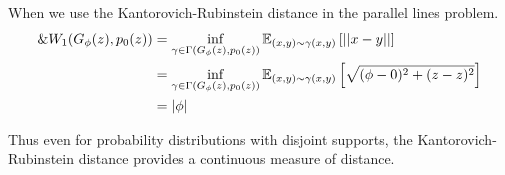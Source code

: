 \begin{example}
  When we use the Kantorovich-Rubinstein distance in the parallel lines problem.
  \begin{align} \&W_1(G_\phi(z), p_0(z)) & = \inf_{\gamma \in \Gamma(G_\phi(z),
                                       p_0(z))}\mathbb{E}_{(x,y) \sim \gamma(x, y)} \left[ || x-y || \right]
    \\
                                     & =\inf_{\gamma \in \Gamma(G_\phi(z), p_0(z))}\mathbb{E}_{(x,y) \sim
                                       \gamma(x, y)} \left[ \sqrt{(\phi - 0)^2 + (z - z)^2} \right] \\ & =
                                                                                                         |\phi|
  \end{align}
\end{example}

Thus even for probability distributions with disjoint supports, the
Kantorovich-Rubinstein distance provides a continuous measure of
distance.

